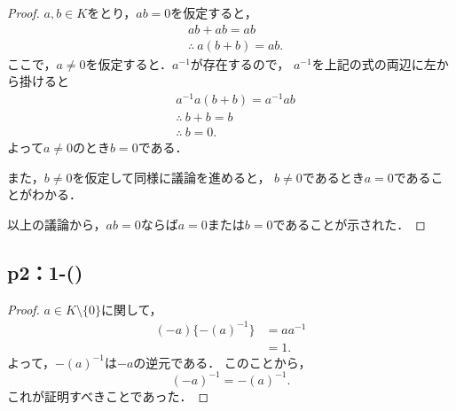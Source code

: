 \begin{leftbar}
    \begin{proof}
        $ a, b \in K$をとり，$ab =0$を仮定すると，
        \begin{align*}
             & ab + ab = ab            \\
             & \therefore ~ a(b+b)=ab.
        \end{align*}
        ここで，$a \ne 0$を仮定すると．$a^{-1}$が存在するので，
        $a^{-1}$を上記の式の両辺に左から掛けると
        \begin{align*}
             & a^{-1}a(b+b)=a^{-1}ab \\
             & \therefore ~ b+b=b    \\
             & \therefore ~ b=0.
        \end{align*}
        よって$a \ne 0$のとき$b=0$である．

        また，$b \ne 0$を仮定して同様に議論を進めると，
        $b \ne 0$であるとき$ a=0$であることがわかる．

        以上の議論から，$ab=0$ならば$a=0$または$b=0$であることが示された．
    \end{proof}
\end{leftbar}

\subsection*{p2：1-()}

\begin{leftbar}
    \begin{proof}
        $ a \in K \setminus \{ 0 \} $に関して，
        \begin{align*}
            (-a) \{ -(a)^{-1} \} & = aa^{-1} \\
                                 & =1.
        \end{align*}
        よって，$-(a)^{-1}$は$-a$の逆元である．
        このことから，
        \[
            (-a)^{-1} = -(a)^{-1}.
        \]
        これが証明すべきことであった．
    \end{proof}
\end{leftbar}
